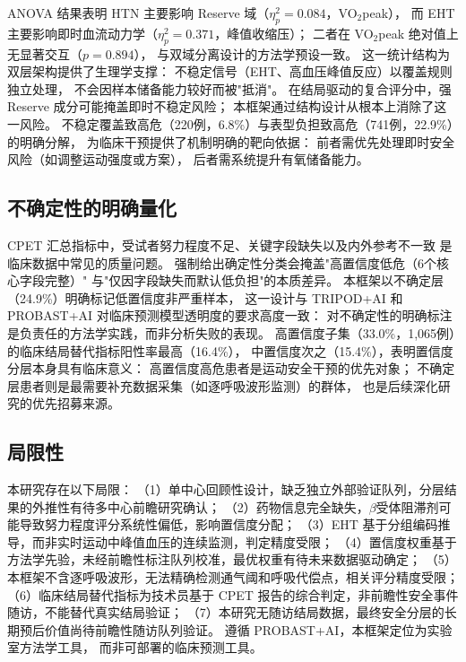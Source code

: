 \documentclass[12pt, a4paper]{ctexart}
\begin{document}
ANOVA 结果表明 HTN 主要影响 Reserve 域（$\eta^2_p = 0.084$，VO$_2$peak），
而 EHT 主要影响即时血流动力学（$\eta^2_p = 0.371$，峰值收缩压）；
二者在 VO$_2$peak 绝对值上无显著交互（$p = 0.894$），
与双域分离设计的方法学预设一致。
这一统计结构为双层架构提供了生理学支撑：
不稳定信号（EHT、高血压峰值反应）以覆盖规则独立处理，
不会因样本储备能力较好而被"抵消"。
在结局驱动的复合评分中，强 Reserve 成分可能掩盖即时不稳定风险；
本框架通过结构设计从根本上消除了这一风险。
不稳定覆盖致高危（220例，6.8\%）与表型负担致高危（741例，22.9\%）的明确分解，
为临床干预提供了机制明确的靶向依据：
前者需优先处理即时安全风险（如调整运动强度或方案），
后者需系统提升有氧储备能力。

\subsection{不确定性的明确量化}

CPET 汇总指标中，受试者努力程度不足、关键字段缺失以及内外参考不一致
是临床数据中常见的质量问题。
强制给出确定性分类会掩盖"高置信度低危（6个核心字段完整）"
与"仅因字段缺失而默认低负担"的本质差异。
本框架以不确定层（24.9\%）明确标记低置信度非严重样本，
这一设计与 TRIPOD+AI\cite{TRIPODAI2024} 和 PROBAST+AI\cite{PROBASTAI2025}
对临床预测模型透明度的要求高度一致：
对不确定性的明确标注是负责任的方法学实践，而非分析失败的表现。
高置信度子集（33.0\%，1,065例）的临床结局替代指标阳性率最高（16.4\%），
中置信度次之（15.4\%），表明置信度分层本身具有临床意义：
高置信度高危患者是运动安全干预的优先对象；
不确定层患者则是最需要补充数据采集（如逐呼吸波形监测）的群体，
也是后续深化研究的优先招募来源。

\subsection{局限性}

本研究存在以下局限：
（1）单中心回顾性设计，缺乏独立外部验证队列，分层结果的外推性有待多中心前瞻研究确认；
（2）药物信息完全缺失，$\beta$受体阻滞剂可能导致努力程度评分系统性偏低，影响置信度分配；
（3）EHT 基于分组编码推导，而非实时运动中峰值血压的连续监测，判定精度受限；
（4）置信度权重基于方法学先验，未经前瞻性标注队列校准，最优权重有待未来数据驱动确定；
（5）本框架不含逐呼吸波形，无法精确检测通气阈和呼吸代偿点，相关评分精度受限；
（6）临床结局替代指标为技术员基于 CPET 报告的综合判定，非前瞻性安全事件随访，不能替代真实结局验证；
（7）本研究无随访结局数据，最终安全分层的长期预后价值尚待前瞻性随访队列验证。
遵循 PROBAST+AI\cite{PROBASTAI2025}，本框架定位为实验室方法学工具，
而非可部署的临床预测工具。
\end{document}
